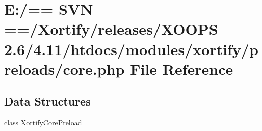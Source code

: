 \hypertarget{core_8php}{\section{E\-:/== S\-V\-N ==/\-Xortify/releases/\-X\-O\-O\-P\-S 2.6/4.11/htdocs/modules/xortify/preloads/core.php File Reference}
\label{core_8php}
}
\subsection*{Data Structures}
\begin{DoxyCompactItemize}
\item 
class \hyperlink{class_xortify_core_preload}{Xortify\-Core\-Preload}
\end{DoxyCompactItemize}
